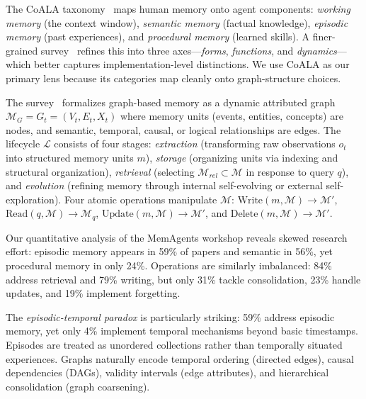 \documentclass[hf]{ceurart}
\begin{document}
The CoALA taxonomy~\cite{sumers2024} maps human memory onto agent
components: \emph{working memory} (the context window),
\emph{semantic memory} (factual knowledge), \emph{episodic memory}
(past experiences), and \emph{procedural memory} (learned skills).
A finer-grained survey~\cite{hu2025survey} refines this into three
axes---\emph{forms}, \emph{functions}, and \emph{dynamics}---which
better captures implementation-level distinctions. We use CoALA as our
primary lens because its categories map cleanly onto graph-structure
choices.

The survey~\cite{graphmemsurvey2026} formalizes graph-based memory as a
dynamic attributed graph $\mathcal{M}_G = G_t = (V_t, E_t, X_t)$
where memory units (events, entities, concepts) are nodes, and
semantic, temporal, causal, or logical relationships are edges. The
lifecycle $\mathcal{L}$ consists of four stages: \emph{extraction}
(transforming raw observations $o_t$ into structured memory units $m$),
\emph{storage} (organizing units via indexing and structural
organization), \emph{retrieval} (selecting $\mathcal{M}_{rel}
\subset \mathcal{M}$ in response to query $q$), and \emph{evolution}
(refining memory through internal self-evolving or external
self-exploration). Four atomic operations manipulate $\mathcal{M}$:
$\text{Write}(m, \mathcal{M}) \to \mathcal{M}'$,
$\text{Read}(q, \mathcal{M}) \to \mathcal{M}_q$,
$\text{Update}(m, \mathcal{M}) \to \mathcal{M}'$, and
$\text{Delete}(m, \mathcal{M}) \to \mathcal{M}'$.

Our quantitative analysis of the MemAgents workshop reveals skewed
research effort: episodic memory appears in 59\% of papers and semantic
in 56\%, yet procedural memory in only 24\%. Operations are similarly
imbalanced: 84\% address retrieval and 79\% writing, but only 31\%
tackle consolidation, 23\% handle updates, and 19\% implement forgetting.

The \emph{episodic-temporal paradox} is particularly striking: 59\%
address episodic memory, yet only 4\% implement temporal mechanisms
beyond basic timestamps. Episodes are treated as unordered collections
rather than temporally situated experiences. Graphs naturally encode
temporal ordering (directed edges), causal dependencies (DAGs),
validity intervals (edge attributes), and hierarchical consolidation
(graph coarsening).
\end{document}
